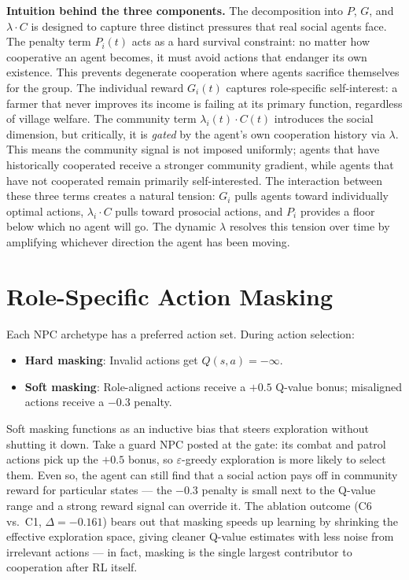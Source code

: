 \documentclass[12pt, a4paper, oneside]{report}
\begin{document}
\textbf{Intuition behind the three components.}
The decomposition into $P$, $G$, and $\lambda \cdot C$ is designed to capture three distinct pressures that real social agents face. The penalty term $P_i(t)$ acts as a hard survival constraint: no matter how cooperative an agent becomes, it must avoid actions that endanger its own existence. This prevents degenerate cooperation where agents sacrifice themselves for the group. The individual reward $G_i(t)$ captures role-specific self-interest: a farmer that never improves its income is failing at its primary function, regardless of village welfare. The community term $\lambda_i(t) \cdot C(t)$ introduces the social dimension, but critically, it is \emph{gated} by the agent's own cooperation history via $\lambda$. This means the community signal is not imposed uniformly; agents that have historically cooperated receive a stronger community gradient, while agents that have not cooperated remain primarily self-interested. The interaction between these three terms creates a natural tension: $G_i$ pulls agents toward individually optimal actions, $\lambda_i \cdot C$ pulls toward prosocial actions, and $P_i$ provides a floor below which no agent will go. The dynamic $\lambda$ resolves this tension over time by amplifying whichever direction the agent has been moving.

\section{Role-Specific Action Masking}
\label{sec:action-masking}

Each NPC archetype has a preferred action set. During action selection:
\begin{itemize}[nosep]
    \item \textbf{Hard masking}: Invalid actions get $Q(s,a) = -\infty$.
    \item \textbf{Soft masking}: Role-aligned actions receive a $+0.5$ Q-value bonus; misaligned actions receive a $-0.3$ penalty.
\end{itemize}

Soft masking functions as an inductive bias that steers exploration without shutting it down. Take a guard NPC posted at the gate: its combat and patrol actions pick up the $+0.5$ bonus, so $\varepsilon$-greedy exploration is more likely to select them. Even so, the agent can still find that a social action pays off in community reward for particular states --- the $-0.3$ penalty is small next to the Q-value range and a strong reward signal can override it. The ablation outcome (C6 vs.\ C1, $\Delta = -0.161$) bears out that masking speeds up learning by shrinking the effective exploration space, giving cleaner Q-value estimates with less noise from irrelevant actions --- in fact, masking is the single largest contributor to cooperation after RL itself.
\end{document}
